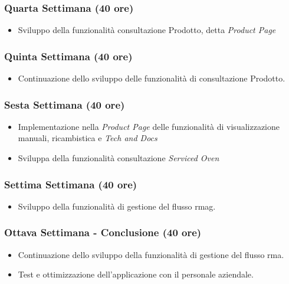 \subsubsection*{Quarta Settimana (40 ore)}
\begin{itemize}
    \item Sviluppo della funzionalità consultazione Prodotto, detta \textit{Product Page}
\end{itemize}

\subsubsection*{Quinta Settimana (40 ore)}
\begin{itemize}
    \item Continuazione dello sviluppo delle funzionalità di consultazione Prodotto.
\end{itemize}

\subsubsection*{Sesta Settimana (40 ore)}
\begin{itemize}
    \item Implementazione nella \textit{Product Page} delle funzionalità di visualizzazione manuali, ricambistica e \textit{Tech and Docs} 
    \item Sviluppa della funzionalità consultazione \textit{Serviced Oven} 
\end{itemize}

\subsubsection*{Settima Settimana (40 ore)}
\begin{itemize}
    \item Sviluppo della funzionalità di gestione del flusso \gls{rmag}\glox\gloxspacing.
\end{itemize}

\subsubsection*{Ottava Settimana - Conclusione (40 ore)}
\begin{itemize}
    \item Continuazione dello sviluppo della funzionalità di gestione del flusso \gls{rma}.
    \item Test e ottimizzazione dell'applicazione con il personale aziendale.
\end{itemize}

